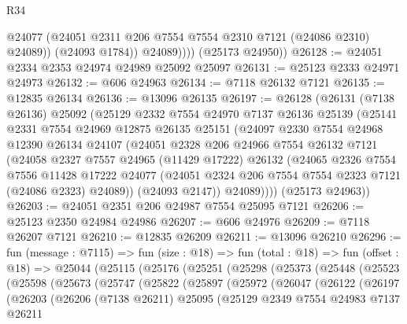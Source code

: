 \begin{lexlean}{R34}
\begin{coremodule}
                  @24077
                  (@24051 @2311 @206 @7554 @7554 @2310 @7121 (@24086 @2310) @24089))
                (@24093 @1784))
              @24089))))
      (@25173 @24950))
@26128 := @24051 @2334 @2353 @24974 @24989 @25092 @25097
@26131 := @25123 @2333 @24971 @24973
@26132 := @606 @24963
@26134 := @7118 @26132 @7121
@26135 := @12835 @26134
@26136 := @13096 @26135
@26197 := @26128
    (@26131
      (@7138 @26136)
      @25092
      (@25129
        @2332
        @7554
        @24970
        @7137
        @26136
        @25139
        (@25141
          @2331
          @7554
          @24969
          @12875
          @26135
          @25151
          (@24097
            @2330
            @7554
            @24968
            @12390
            @26134
            @24107
            (@24051
              @2328
              @206
              @24966
              @7554
              @26132
              @7121
              (@24058
                @2327
                @7557
                @24965
                (@11429 @17222)
                @26132
                (@24065
                  @2326
                  @7554
                  @7556
                  @11428
                  @17222
                  @24077
                  (@24051 @2324 @206 @7554 @7554 @2323 @7121 (@24086 @2323) @24089))
                (@24093 @2147))
              @24089))))
      (@25173 @24963))
@26203 := @24051 @2351 @206 @24987 @7554 @25095 @7121
@26206 := @25123 @2350 @24984 @24986
@26207 := @606 @24976
@26209 := @7118 @26207 @7121
@26210 := @12835 @26209
@26211 := @13096 @26210
@26296 := fun (message : @7115) =>
  fun (size : @18) =>
  fun (total : @18) =>
  fun (offset : @18) =>
  @25044
    (@25115
      (@25176
        (@25251
          (@25298
            (@25373
              (@25448
                (@25523
                  (@25598
                    (@25673
                      (@25747
                        (@25822
                          (@25897
                            (@25972
                              (@26047
                                (@26122
                                  (@26197
                                    (@26203
                                      (@26206
                                        (@7138 @26211)
                                        @25095
                                        (@25129
                                          @2349
                                          @7554
                                          @24983
                                          @7137
                                          @26211

\end{coremodule}
\end{lexlean}
